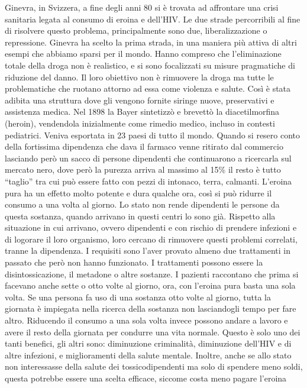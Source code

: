 \documentclass[12pt]{book} %
\begin{document}
\begin{mdframed}[linewidth=1pt]
Ginevra, in Svizzera, a fine degli anni 80 si è trovata ad affrontare una crisi sanitaria legata al consumo di eroina e dell'HIV. Le due
strade percorribili al fine di risolvere questo problema, principalmente sono due, liberalizzazione o repressione. Ginevra ha scelto la
prima strada, in una maniera più attiva di altri esempi che abbiamo sparsi per il mondo. Hanno compreso che l’eliminazione totale della droga non è realistico, e si sono focalizzati su misure pragmatiche di riduzione del danno. 
Il loro obiettivo non è rimuovere la droga ma tutte le problematiche che ruotano
attorno ad essa come violenza e salute. Così è stata adibita una struttura dove gli vengono fornite siringe nuove,
preservativi e assistenza medica. Nel 1898 la Bayer sintetizzò e brevettò la diacetilmorfina (heroin), vendendola inizialmente come rimedio medico, incluso in contesti pediatrici. Veniva esportata in 23 paesi di tutto il mondo. Quando si resero conto della fortissima
dipendenza che dava il farmaco venne ritirato dal commercio lasciando però un sacco di persone dipendenti che
continuarono a ricercarla sul mercato nero, dove però la purezza arriva al massimo al 15\% il resto è tutto “taglio”
tra cui può essere fatto con pezzi di intonaco, terra, calmanti. L'eroina pura ha un effetto molto potente e dura qualche ora, così si può ridurre il consumo a una volta al giorno. Lo stato non rende dipendenti le persone da questa sostanza, quando arrivano in questi centri lo sono già. Rispetto alla
situazione in cui arrivano, ovvero dipendenti e con rischio di prendere infezioni e di logorare il loro organismo, loro
cercano di rimuovere questi problemi correlati, tranne la dipendenza. I requisiti sono l'aver provato almeno due trattamenti in passato che però non hanno funzionato. I trattamenti possono essere la disintossicazione, il metadone o altre sostanze. I pazienti raccontano che prima si facevano anche sette o otto volte al giorno, ora, con l'eroina
pura basta una sola volta. Se una persona fa uso di una sostanza otto volte al giorno, tutta la giornata è impiegata
nella ricerca della sostanza non lasciandogli tempo per fare altro. Riducendo il consumo a una sola volta invece possono
andare a lavoro e avere il resto della giornata per condurre una vita normale. Questo è solo uno dei tanti benefici, gli altri sono: diminuzione criminalità, diminuzione dell'HIV e di altre infezioni, e miglioramenti della salute mentale. Inoltre, anche se allo stato non interessasse della salute dei tossicodipendenti ma
solo di spendere meno soldi, questa potrebbe essere una scelta efficace, siccome costa meno pagare l'eroina

\end{mdframed}
\end{document}
